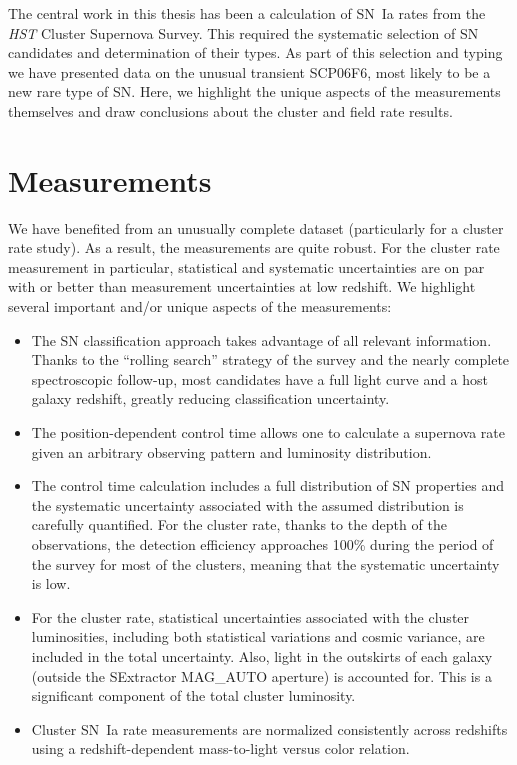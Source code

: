 The central work in this thesis has been a calculation of SN~Ia rates
from the \emph{HST} Cluster Supernova Survey. This required the
systematic selection of SN candidates and determination of their
types. As part of this selection and typing we have presented data on
the unusual transient SCP06F6, most likely to be a new rare type of
SN.  Here, we highlight the unique aspects of the measurements
themselves and draw conclusions about the cluster and field rate
results.

\section{Measurements}

We have benefited from an unusually complete dataset (particularly for
a cluster rate study). As a result, the measurements are quite
robust. For the cluster rate measurement in particular, statistical
and systematic uncertainties are on par with or better than
measurement uncertainties at low redshift. We highlight several
important and/or unique aspects of the measurements:
\begin{itemize}
\item The SN classification approach takes advantage
  of all relevant information. Thanks to the ``rolling search''
  strategy of the survey and the nearly complete spectroscopic
  follow-up, most candidates have a full light curve and a host galaxy
  redshift, greatly reducing classification uncertainty.
\item The position-dependent control time allows one to calculate a
  supernova rate given an arbitrary observing pattern and luminosity
  distribution.
\item The control time calculation includes a full distribution of SN
  properties and the systematic uncertainty associated with the assumed 
  distribution is carefully quantified. For the cluster rate, thanks to the
  depth of the observations, the detection efficiency approaches
  100\% during the period of the survey for most of the clusters,
  meaning that the systematic uncertainty is low.
\item For the cluster rate, statistical uncertainties associated with the cluster
  luminosities, including both statistical variations and cosmic
  variance, are included in the total uncertainty.  Also, light in the
  outskirts of each galaxy (outside the {\sc SExtractor} MAG\_AUTO
  aperture) is accounted for.  This is a significant component of the
  total cluster luminosity.
\item Cluster SN~Ia rate measurements are normalized consistently across
  redshifts using a redshift-dependent mass-to-light versus color
  relation.
\end{itemize}

